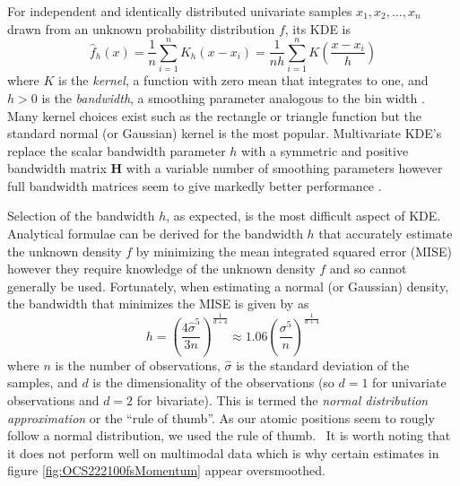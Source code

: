 For independent and identically distributed univariate samples $x_1, x_2, \dots, x_n$ drawn from an unknown probability distribution $f$, its KDE is
\begin{equation}
\hat{f}_h(x) = \frac{1}{n} \sum_{i=1}^n K_h(x-x_i)
= \frac{1}{nh} \sum_{i=1}^n K\left(\frac{x - x_i}{h}\right)
\end{equation}
where $K$ is the \emph{kernel}, a function with zero mean that integrates to one, and $h > 0$ is the \emph{bandwidth}, a smoothing parameter analogous to the bin width \citep[pp. 137]{Scott15}. Many kernel choices exist such as the rectangle or triangle function but the standard normal (or Gaussian) kernel is the most popular. Multivariate KDE's replace the scalar bandwidth parameter $h$ with a symmetric and positive bandwidth matrix $\mathbf{H}$ with a variable number of smoothing parameters \citep{Wand93} however full bandwidth matrices seem to give markedly better performance \citep{Duong03}.

Selection of the bandwidth $h$, as expected, is the most difficult aspect of KDE. Analytical formulae can be derived for the bandwidth $h$ \citep[pp. 143]{Scott15} that accurately estimate the unknown density $f$ by minimizing the mean integrated squared error (MISE) however they require knowledge of the unknown density $f$ and so cannot generally be used. Fortunately, when estimating a normal (or Gaussian) density, the bandwidth that minimizes the MISE is given by \citet{Silverman86} as
\begin{equation}
  h = \left(\frac{4\hat{\sigma}^5}{3n} \right)^\frac{1}{d+4}
    \approx 1.06 \left(\frac{\sigma^5}{n} \right)^\frac{1}{d+4}
\end{equation}
where $n$ is the number of observations, $\hat{\sigma}$ is the standard deviation of the samples, and $d$ is the dimensionality of the observations (so $d=1$ for univariate observations and $d=2$ for bivariate). This is termed the \emph{normal distribution approximation} or the ``rule of thumb''. As our atomic positions seem to rougly follow a normal distribution, we used the \citet{Silverman86} rule of thumb.\footnotemark~ It is worth noting that it does not perform well on multimodal data which is why certain estimates in figure \ref{fig:OCS222100fsMomentum} appear oversmoothed.


